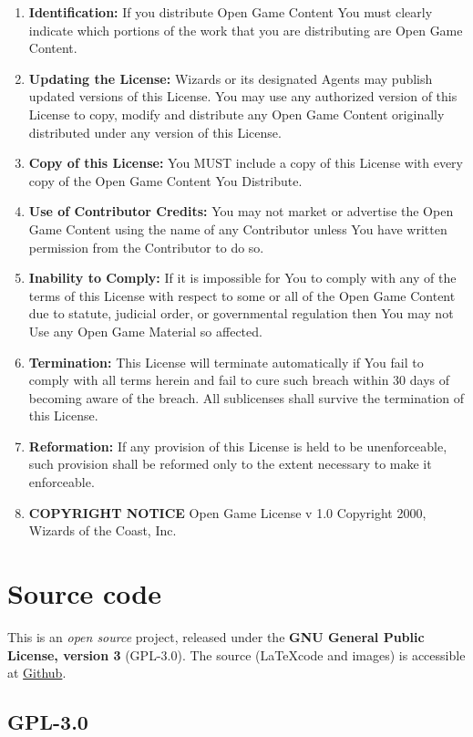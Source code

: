 \begin{enumerate}
 \item \textbf{Identification:} If you distribute Open Game Content You must clearly indicate which portions of the work that you are distributing are Open Game Content.
 \item \textbf{Updating the License:} Wizards or its designated Agents may publish updated versions of this License. You may use any authorized version of this License to copy, modify and distribute any Open Game Content originally distributed under any version of this License.
 \item \textbf{Copy of this License:} You MUST include a copy of this License with every copy of the Open Game Content You Distribute.
 \item \textbf{Use of Contributor Credits:} You may not market or advertise the Open Game Content using the name of any Contributor unless You have written permission from the Contributor to do so.
 \item \textbf{Inability to Comply:} If it is impossible for You to comply with any of the terms of this License with respect to some or all of the Open Game Content due to statute, judicial order, or governmental regulation then You may not Use any Open Game Material so affected.
 \item \textbf{Termination:} This License will terminate automatically if You fail to comply with all terms herein and fail to cure such breach within 30 days of becoming aware of the breach. All sublicenses shall survive the termination of this License.
 \item \textbf{Reformation:} If any provision of this License is held to be unenforceable, such provision shall be reformed only to the extent necessary to make it enforceable.
 \item \textbf{COPYRIGHT NOTICE} Open Game License v 1.0 Copyright 2000, Wizards of the Coast, Inc.
\end{enumerate}
\section{Source code}
This is an \emph{open source} project, released under the \textbf{GNU General Public License, version 3} (GPL-3.0). The source (\LaTeX code and images) is accessible at \href{https://github.com/Ernir/VancianToPsionics}{Github}.
\subsection{GPL-3.0}

